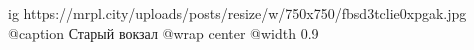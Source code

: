  
 
 
 
 

\ifcmt
  ig https://mrpl.city/uploads/posts/resize/w/750x750/fbsd3tclie0xpgak.jpg
	@caption Старый вокзал
  @wrap center
  @width 0.9
\fi

